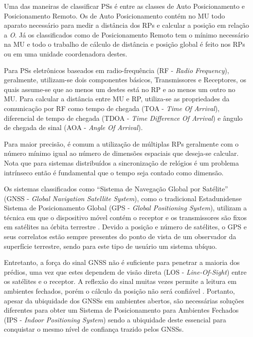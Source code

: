 Uma das maneiras de classificar PSs é entre as classes de Auto Posicionamento e
Posicionamento Remoto. Os de Auto Posicionamento contém no MU todo aparato
necessário para medir a distância dos RPs e calcular a posição em relação a
\emph{O}. Já os classificados como de Posicionamento Remoto tem o mínimo
necessário na MU e todo o trabalho de cálculo de distância e posição global é
feito nos RPs ou em uma unidade coordenadora destes.

Para PSs eletrônicos baseados em radio-frequência (RF - \emph{Radio
Frequency}), geralmente, utilizam-se dois componentes básicos, Transmissores e
Receptores, os quais assume-se que ao menos um destes está no RP e ao menos um
outro no MU. Para calcular a distância entre MU e RP, utiliza-se as propriedades
da comunicação por RF como tempo de chegada (TOA - \emph{Time Of Arrival}),
diferencial de tempo de chegada (TDOA - \emph{Time Difference Of Arrival}) e
ângulo de chegada de sinal (AOA - \emph{Angle Of Arrival}).

Para maior precisão, é comum a utilização de múltiplas RPs geralmente com o
número mínimo igual ao número de dimensões espaciais que deseja-se calcular.
Nota que para sistemas distribuídos a sincronização de relógios é um problema
intrínseco então é fundamental que o tempo seja contado como dimensão.

Os sistemas classificados como ``Sistema de Navegação Global por Satélite''
(GNSS - \emph{Global Navigation Satellite System}), como o tradicional
Estadunidense Sistema de Posicionamento Global (GPS - \emph{Global Positioning
System}), utilizam a técnica em que o dispositivo móvel contém o receptor e os
transmissores são fixos em satélites na órbita terrestre \cite{Djuknic2001}.
Devido a posição e número de satélites, o GPS e seus correlatos estão sempre
presentes do ponto de vista de um observador da superfície terrestre, sendo para
este tipo de usuário um sistema ubíquo.

Entretanto, a força do sinal GNSS não é suficiente para penetrar a maioria dos
prédios, uma vez que estes dependem de visão direta (LOS -
\emph{Line-Of-Sight}) entre os satélites e o receptor. A reflexão do sinal
muitas vezes permite a leitura em ambientes fechados, porém o cálculo da posição
não será confiável \cite{Chen2000}. Portanto, apesar da ubiquidade dos
GNSSs em ambientes abertos, são necessárias soluções diferentes para obter um
Sistema de Posicionamento para Ambientes Fechados (IPS - \emph{Indoor
Positioning System}) sendo a ubiquidade deste essencial para conquistar o mesmo
nível de confiança trazido pelos GNSSs.

